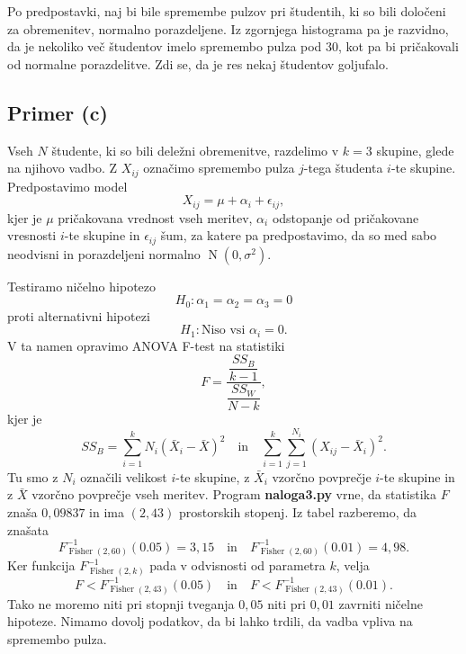 \documentclass[a4paper,11pt]{article}
\DeclareMathOperator{\Fisher}{Fisher}
\DeclareMathOperator{\N}{N}
\begin{document}
Po predpostavki, naj bi bile spremembe pulzov pri študentih, ki so bili določeni za obremenitev, normalno porazdeljene.
Iz zgornjega histograma pa je razvidno, da je nekoliko več študentov imelo spremembo pulza pod $30$, kot pa bi pričakovali od normalne porazdelitve.
Zdi se, da je res nekaj študentov goljufalo.

\subsection*{Primer (c)}

Vseh $N$ študente, ki so bili deležni obremenitve, razdelimo v $k=3$ skupine, glede na njihovo vadbo. 
Z $X_{ij}$ označimo spremembo pulza $j$-tega študenta $i$-te skupine.
Predpostavimo model 
\[X_{ij} = \mu + \alpha_i + \epsilon_{ij},\]
kjer je $\mu$ pričakovana vrednost vseh meritev, $\alpha_i$ odstopanje od pričakovane vresnosti $i$-te skupine in $\epsilon_{ij}$ šum, 
za katere pa predpostavimo, da so med sabo neodvisni in porazdeljeni normalno $\N(0, \sigma^2)$.

Testiramo ničelno hipotezo
\[H_0: \alpha_1 = \alpha_2 = \alpha_3 = 0\]
proti alternativni hipotezi
\[H_1: \text{Niso vsi } \alpha_i = 0.\]
V ta namen opravimo ANOVA F-test na statistiki
\[F = \frac{\dfrac{SS_B}{k-1}}{\dfrac{SS_W}{N-k}},\]
kjer je 
\[SS_B = \sum_{i=1}^k N_i(\bar{X}_i - \bar{X})^2 \quad \text{in} \quad \sum_{i=1}^k \sum_{j=1}^{N_i}(X_{ij}-\bar{X}_i)^2.\]
Tu smo z $N_i$ označili velikost $i$-te skupine, z $\bar{X}_i$ vzorčno povprečje $i$-te skupine in z $\bar{X}$ vzorčno povprečje vseh meritev.
Program \textbf{naloga3.py} vrne, da statistika $F$ znaša $0,09837$ in ima $(2, 43)$ prostorskih stopenj.
Iz tabel razberemo, da znašata 
\[F^{-1}_{\Fisher(2, 60)}(0.05) = 3{,}15 \quad \text{in} \quad F^{-1}_{\Fisher(2, 60)}(0.01) = 4{,}98.\]
Ker funkcija $F^{-1}_{\Fisher(2, k)}$ pada v odvisnosti od parametra $k$, velja
\[F < F^{-1}_{\Fisher(2, 43)}(0.05) \quad \text{in} \quad F < F^{-1}_{\Fisher(2, 43)}(0.01).\]
Tako ne moremo niti pri stopnji tveganja $0{,}05$ niti pri $0{,}01$ zavrniti ničelne hipoteze.
Nimamo dovolj podatkov, da bi lahko trdili, da vadba vpliva na spremembo pulza.
\end{document}
